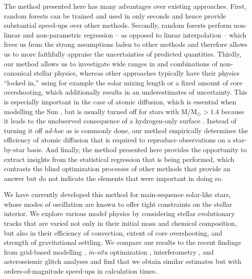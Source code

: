 \documentclass[manuscript]{aastex}
\begin{document}
The method presented here has many advantages over existing approaches. First, random forests can be trained and used in only seconds and hence provide substantial speed-ups over other methods. 
Secondly, random forests perform non-linear and non-parametric regression -- as opposed to linear interpolation -- which frees us from the strong assumptions laden to other methods and therefore allows us to more faithfully appraise the uncertainties of predicted quantities. 
Thirdly, our method allows us to investigate wide ranges in and combinations of non-canonical stellar physics, whereas other approaches typically have their physics ``locked in,'' using for example the solar mixing length or a fixed amount of core overshooting, which additionally results in an underestimates of uncertainty. This is especially important in the case of atomic diffusion, which is essential when modelling the Sun \citep[see e.g.][]{1994MNRAS.269.1137B}, but is usually turned off for stars with M/M$_\odot > 1.4$ because it leads to the unobserved consequence of a hydrogen-only surface \citep{2002A&A...390..611M}. Instead of turning it off \emph{ad-hoc} as is commonly done, our method empirically determines the efficiency of atomic diffusion that is required to reproduce observations on a star-by-star basis. 
And finally, the method presented here provides the opportunity to extract insights from the statistical regression that is being performed, which contrasts the blind optimization processes of other methods that provide an answer but do not indicate the elements that were important in doing so. 

We have currently developed this method for main-sequence solar-like stars, whose modes of oscillation are known to offer tight constraints on the stellar interior. We explore various model physics by considering stellar evolutionary tracks that are varied not only in their initial mass and chemical composition, but also in their efficiency of convection, extent of core overshooting, and strength of gravitational settling. We compare our results to the recent findings from grid-based modelling \citep{2015MNRAS.452.2127S}, \emph{in-situ} optimization \citep{2015ApJ...811L..37M}, interferometry \citep{2013MNRAS.433.1262W}, and asteroseismic glitch analyses \citep{2014ApJ...790..138V} and find that we obtain similar estimates but with orders-of-magnitude speed-ups in calculation times. 


\end{document}

